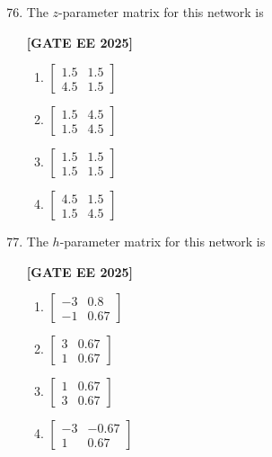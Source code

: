 \documentclass[12pt]{article}
\begin{document}
\begin{enumerate}[leftmargin=*, label=\textbf{Q.\arabic*:}]
\setcounter{enumi}{75}

\item The $z$-parameter matrix for this network is
 
\noindent \textbf{[GATE EE 2025]}
\begin{enumerate}[label=(\Alph*)]
  \item $\begin{bmatrix} 1.5 & 1.5 \\ 4.5 & 1.5 \end{bmatrix}$
  \item $\begin{bmatrix} 1.5 & 4.5 \\ 1.5 & 4.5 \end{bmatrix}$
  \item $\begin{bmatrix} 1.5 & 1.5 \\ 1.5 & 1.5 \end{bmatrix}$
  \item $\begin{bmatrix} 4.5 & 1.5 \\ 1.5 & 4.5 \end{bmatrix}$
\end{enumerate}

\item The $h$-parameter matrix for this network is
 
\noindent \textbf{[GATE EE 2025]}
\begin{enumerate}[label=(\Alph*)]
  \item $\begin{bmatrix} -3 & 0.8 \\ -1 & 0.67 \end{bmatrix}$
  \item $\begin{bmatrix} 3 & 0.67 \\ 1 & 0.67 \end{bmatrix}$
  \item $\begin{bmatrix} 1 & 0.67 \\ 3 & 0.67 \end{bmatrix}$
  \item $\begin{bmatrix} -3 & -0.67 \\ 1 & 0.67 \end{bmatrix}$
\end{enumerate}

\end{enumerate}
\end{document}
